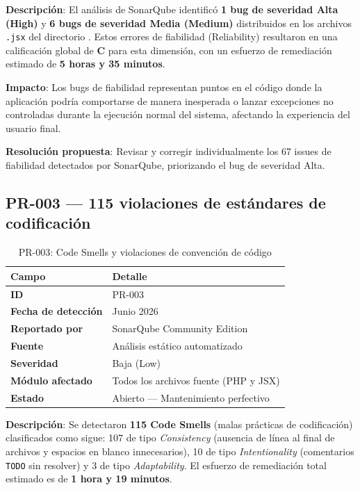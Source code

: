 \documentclass[12pt]{article}
\begin{document}
\textbf{Descripción}: El análisis de SonarQube identificó \textbf{1 bug de severidad
Alta (High)} y \textbf{6 bugs de severidad Media (Medium)} distribuidos en los
archivos \texttt{.jsx} del directorio . Estos errores de
fiabilidad (Reliability) resultaron en una calificación global de \textbf{C} para
esta dimensión, con un esfuerzo de remediación estimado de \textbf{5 horas y 35 minutos}.

\textbf{Impacto}: Los bugs de fiabilidad representan puntos en el código donde la
aplicación podría comportarse de manera inesperada o lanzar excepciones no controladas
durante la ejecución normal del sistema, afectando la experiencia del usuario final.

\textbf{Resolución propuesta}: Revisar y corregir individualmente los 67 issues de
fiabilidad detectados por SonarQube, priorizando el bug de severidad Alta.

\newpage

\subsection[PR-003: 115 violaciones de estándares]{PR-003 --- 115 violaciones de estándares de codificación}

\begin{table}[H]
\centering
\begin{tabularx}{\textwidth}{lX}
\toprule
\textbf{Campo}             & \textbf{Detalle} \\
\midrule
\textbf{ID}                & PR-003 \\
\textbf{Fecha de detección}& Junio 2026 \\
\textbf{Reportado por}     & SonarQube Community Edition \\
\textbf{Fuente}            & Análisis estático automatizado \\
\textbf{Severidad}         & Baja (Low) \\
\textbf{Módulo afectado}   & Todos los archivos fuente (PHP y JSX) \\
\textbf{Estado}            & Abierto --- Mantenimiento perfectivo \\
\bottomrule
\end{tabularx}
\caption{PR-003: Code Smells y violaciones de convención de código}
\end{table}

\textbf{Descripción}: Se detectaron \textbf{115 Code Smells} (malas prácticas de
codificación) clasificados como sigue: 107 de tipo \textit{Consistency} (ausencia
de línea al final de archivos y espacios en blanco innecesarios), 10 de tipo
\textit{Intentionality} (comentarios \texttt{TODO} sin resolver) y 3 de tipo
\textit{Adaptability}. El esfuerzo de remediación total estimado es de
\textbf{1 hora y 19 minutos}.
\end{document}
